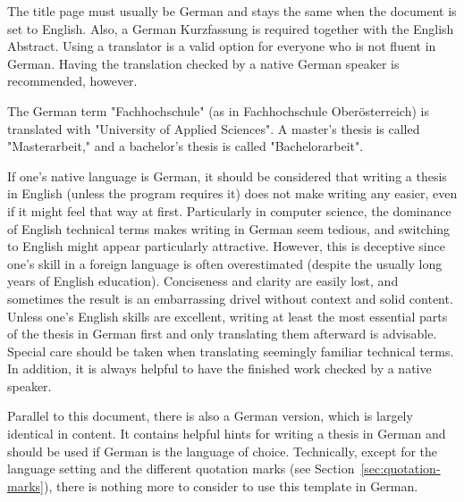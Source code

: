 The title page must usually be German and stays the same when the document is
set to English. Also, a German Kurzfassung is required together with the English
Abstract. Using a translator is a valid option for everyone who is not fluent
in German. Having the translation checked by a native German speaker is
recommended, however.

The German term "Fachhochschule" (as in Fachhochschule Oberösterreich) is
translated with "University of Applied Sciences". A master's thesis is called
"Masterarbeit," and a bachelor's thesis is called "Bachelorarbeit".

If one's native language is German, it should be considered that writing a
thesis in English (unless the program requires it) does not make writing any
easier, even if it might feel that way at first. Particularly in computer
science, the dominance of English technical terms makes writing in German seem
tedious, and switching to English might appear particularly attractive. However,
this is deceptive since one's skill in a foreign language is often overestimated
(despite the usually long years of English education). Conciseness and clarity
are easily lost, and sometimes the result is an embarrassing drivel without
context and solid content. Unless one's English skills are excellent, writing at
least the most essential parts of the thesis in German first and only
translating them afterward is advisable. Special care should be taken when
translating seemingly familiar technical terms. In addition, it is always
helpful to have the finished work checked by a native speaker.

Parallel to this document, there is also a German version, which is largely
identical in content. It contains helpful hints for writing a thesis in German
and should be used if German is the language of choice. Technically, except for
the language setting and the different quotation marks (see
Section~\ref{sec:quotation-marks}), there is nothing more to consider to use
this template in German.
